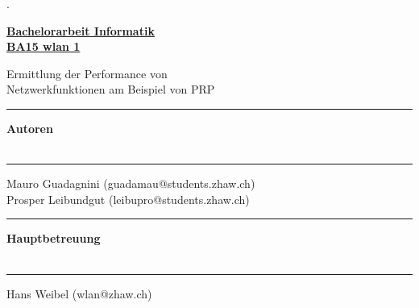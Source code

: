 \AddToShipoutPicture{\BackgroundPic}

\begin{titlepage}


\begin{minipage}[b]{0.095\textwidth}
\hskip 0.05cm
\end{minipage}
\begin{minipage}[b]{0.91\textwidth}
\begin{tiny}.\end{tiny}\vskip 2.8cm
	{\huge
	
	\textbf{\underline{Bachelorarbeit Informatik}}\\
	\textbf{\underline{BA15 wlan 1}}
	
	Ermittlung der Performance von\\
	Netzwerkfunktionen am Beispiel von PRP	
	\vskip 0.5cm}
	
	\begin{minipage}[b]{0.27\textwidth}
	\hrule\vskip 0.5cm
		\textbf{Autoren}\\
		\\
	\end{minipage}
	\begin{minipage}[b]{0.03\textwidth}
	\hskip 0.5cm
	\end{minipage}
	\begin{minipage}[b]{0.7\textwidth}
	\hrule\vskip 0.5cm
		Mauro Guadagnini (guadamau@students.zhaw.ch)\\
		Prosper Leibundgut (leibupro@students.zhaw.ch)\\
	\end{minipage}
	
	\begin{minipage}[b]{0.27\textwidth}
	\hrule\vskip 0.5cm
		\textbf{Hauptbetreuung}\\
		\\
	\end{minipage}
	\begin{minipage}[b]{0.03\textwidth}
	\hskip 0.5cm
	\end{minipage}
	\begin{minipage}[b]{0.7\textwidth}
	\hrule\vskip 0.5cm
		Hans Weibel (wlan@zhaw.ch)\\
        \\
	\end{minipage}
	
	

\end{minipage}
\end{titlepage}
